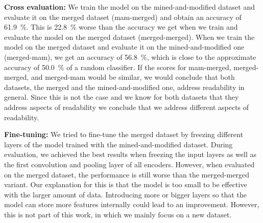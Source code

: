 \documentclass[%
class=scrreprt,
chapterprefix=false,%
open=right,%
twoside=true,%
paper=a4,%
logofile={Logo\_zentral\_farbig\_EN.png},%
thesistype=master,%
UKenglish,%
]{se2thesis}
\theoremstyle{definition}
\begin{document}
	\textbf{Cross evaluation:}
	We train the model on the mined-and-modified dataset and evaluate it on the merged dataset (mam-merged) and obtain an accuracy of 61.9~\%. This is 22.8~\% worse than the accuracy we get when we train and evaluate the model on the merged dataset (merged-merged). When we train the model on the merged dataset and evaluate it on the mined-and-modified one (merged-mam), we get an accuracy of 56.8~\%, which is close to the approximate accuracy of 50.0~\% of a random classifier.
	If the scores for mam-merged, merged-merged, and merged-mam would be similar, we would conclude that both datasets, the merged and the mined-and-modified one, address readability in general. Since this is not the case and we know for both datasets that they address aspects of readability we conclude that we address different aspects of readability.
	
	
	
	\textbf{Fine-tuning:}
	We tried to fine-tune the merged dataset by freezing different layers of the model trained with the mined-and-modified dataset. During evaluation, we achieved the best results when freezing the input layers as well as the first convolution and pooling layer of all encoders. 
	However, when evaluated on the merged dataset, the performance is still worse than the merged-merged variant.
	Our explanation for this is that the model is too small to be effective with the larger amount of data. Introducing more or bigger layers so that the model can store more features internally could lead to an improvement. However, this is not part of this work, in which we mainly focus on a new dataset.
	
\end{document}
